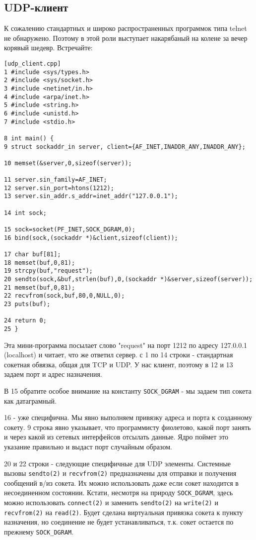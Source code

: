 \subsection{UDP-клиент}

К сожалению стандартных и широко распространенных программок типа telnet не обнаружено. Поэтому в этой роли выступает накарябаный на колене за вечер корявый шедевр. Встречайте:
\begin{verbatim}
[udp_client.cpp]
1 #include <sys/types.h>
2 #include <sys/socket.h>
3 #include <netinet/in.h>
4 #include <arpa/inet.h>
5 #include <string.h>
6 #include <unistd.h>
7 #include <stdio.h>

8 int main() {
9 struct sockaddr_in server, client={AF_INET,INADDR_ANY,INADDR_ANY};

10 memset(&server,0,sizeof(server));

11 server.sin_family=AF_INET;
12 server.sin_port=htons(1212);
13 server.sin_addr.s_addr=inet_addr("127.0.0.1");

14 int sock;

15 sock=socket(PF_INET,SOCK_DGRAM,0);
16 bind(sock,(sockaddr *)&client,sizeof(client));

17 char buf[81];
18 memset(buf,0,81);
19 strcpy(buf,"request");
20 sendto(sock,&buf,strlen(buf),0,(sockaddr *)&server,sizeof(server));
21 memset(buf,0,81);
22 recvfrom(sock,buf,80,0,NULL,0);
23 puts(buf);

24 return 0;
25 }
\end{verbatim}

Эта мини-программа посылает слово "request" на порт 1212 по адресу 127.0.0.1 (localhost) и читает, что же ответил сервер.
с 1 по 14 строки - стандартная сокетная обвязка, общая для TCP и UDP. У нас клиент, поэтому в 12 и 13 задаем порт и адрес назначения.

В 15 обратите особое внимание на константу \verb+SOCK_DGRAM+ - мы задаем тип сокета как датаграмный.

16 - уже специфична. Мы явно выполняем привязку адреса и порта к созданному сокету. 9 строка явно указывает, что программисту фиолетово, какой порт занять и через какой из сетевых интерфейсов отсылать данные. Ядро поймет это указание правильно и выдаст порт случайным образом.

20 и 22 строки - следующие специфичные для UDP элементы. Системные вызовы \verb+sendto(2)+ и \verb+recvfrom(2)+ предназначены для отправки и получения сообщений в/из сокета. Их можно использовать даже если сокет находится в несоединенном состоянии. Кстати, несмотря на природу \verb+SOCK_DGRAM+, здесь можно использовать \verb+connect(2)+ и заменить \verb+sendto(2)+ на \verb+write(2)+ и \verb+recvfrom(2)+ на \verb+read(2)+. Будет сделана виртуальная привязка сокета к пункту назначения, но соединение не будет устанавливаться, т.к. сокет остается по прежнему \verb+SOCK_DGRAM+.

